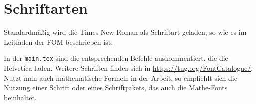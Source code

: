 
\chapter{Schriftarten}\label{ch:schriftarten}

Standardmäßig wird die Times New Roman als Schriftart geladen, so wie es im Leitfaden der FOM beschrieben ist. 

In der \texttt{main.tex} sind die entsprechenden Befehle auskommentiert, die die Helvetica laden. Weitere Schriften finden sich in \url{https://tug.org/FontCatalogue/}. Nutzt man auch mathematische Formeln in der Arbeit, so empfiehlt sich die Nutzung einer Schrift oder eines Schriftpakets, das auch die Mathe-Fonts beinhaltet.